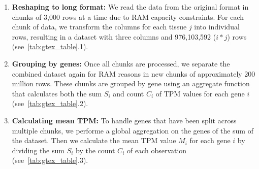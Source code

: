 \begin{enumerate}
    \item \textbf{Reshaping to long format:}
    We read the data from the original format in chunks of 3,000 rows at a time due to RAM capacity constraints.
    For each chunk of data, we transform the columns for each tissue $j$ into individual rows,
    resulting in a dataset with three columns and 976,103,592 ($i * j$) rows (see~\cref{tab:gtex_table}.1).

    \item \textbf{Grouping by genes:}
    Once all chunks are processed, we separate the combined dataset again for RAM reasons
    in new chunks of approximately 200 million rows.
    These chunks are grouped by gene using an aggregate function that calculates
    both the sum $S_i$ and count $C_i$ of TPM values for each gene $i$ (see~\cref{tab:gtex_table}.2).

    \item \textbf{Calculating mean TPM:}
    To handle genes that have been split across multiple chunks,
    we performe a global aggregation on the genes of the sum of the dataset.
    Then we calculate the mean TPM value $M_i$ for each gene $i$ by dividing the sum $S_i$ by the count $C_i$
    of each observation (see~\cref{tab:gtex_table}.3).
\end{enumerate}

